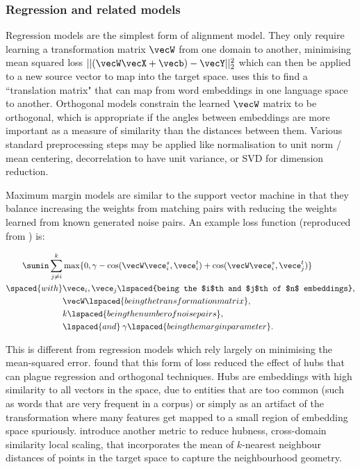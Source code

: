 \subsubsection{Regression and related models}

Regression models are the simplest form of alignment model. They only require learning a transformation matrix $\vecW$ from one domain to another, minimising mean squared loss $|| (\vecW \vecX + \vecb) - \vecY||_2^2$ which can then be applied to a new source vector to map into the target space. \cite{MikolovMachineTranslation} uses this to find a ``translation matrix" that can map from word embeddings in one language space to another. Orthogonal models constrain the learned $\vecW$ matrix to be orthogonal, which is appropriate if the angles between embeddings are more important as a measure of similarity than the distances between them. Various standard preprocessing steps may be applied like normalisation to unit norm / mean centering, decorrelation to have unit variance, or SVD for dimension reduction.

Maximum margin models are similar to the support vector machine \cite{SVM} in that they balance increasing the weights from matching pairs with reducing the weights learned from known generated noise pairs. An example loss function (reproduced from \cite{kalinowski2020survey}) is:

\begin{equation}
\begin{split}
\sumin \sum_{j \neq i}^{k} &\max \{0, \gamma - \cos(\vecW \vece_i^s, \vece_i^t) + \cos(\vecW \vece_i^s, \vece_j^t)\}\\
\spaced{with}& \vece_i, \vece_j \lspaced{being the $i$th and $j$th of $n$ embeddings},\\
& \vecW \lspaced{being the transformation matrix},\\
& k \lspaced{being the number of noise pairs}, \\
& \lspaced{and}\medspace \gamma \lspaced{being the margin parameter}.
\end{split}
\end{equation}

This is different from regression models which rely largely on minimising the mean-squared error. \cite{Hubness} found that this form of loss reduced the effect of hubs that can plague regression and orthogonal techniques. Hubs are embeddings with high similarity to all vectors in the space, due to entities that are too common (such as words that are very frequent in a corpus) or simply as an artifact of the transformation where many features get mapped to a small region of embedding space spuriously. \cite{ImprovingSupervisedBilingualMapping} introduce another metric to reduce hubness, cross-domain similarity local scaling, that incorporates the mean of $k$-nearest neighbour distances of points in the target space to capture the neighbourhood geometry. 

